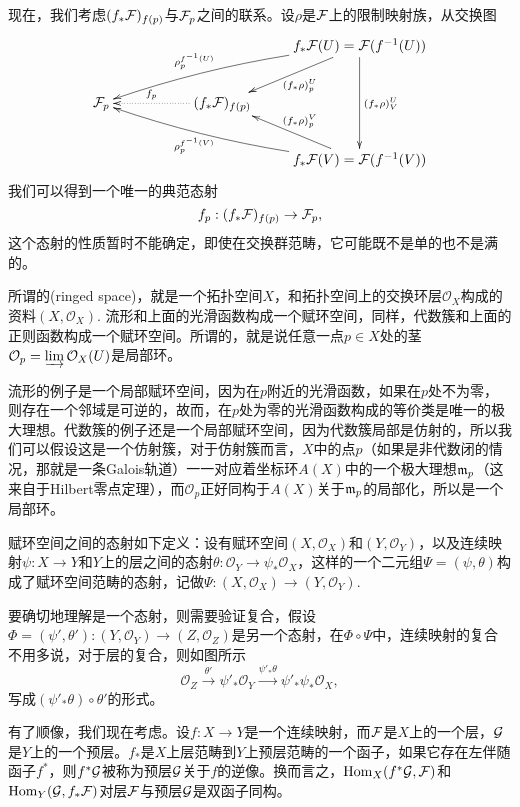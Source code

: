现在，我们考虑$(f_*\mathcal{F})_{f(p)}$与$\mathcal{F}_p$之间的联系。设$\rho$是$\mathcal{F}$上的限制映射族，从交换图
\[
	\xymatrix{
		&&&f_*\calf(U)=\calf(f^{-1}(U))\ar[dl]^{(f_*\rho)_{p}^U}\ar[dd]^{(f_*\rho)^U_{V}}\ar@/_/[llld]_-{\rho_{p}^{f^{-1}(U)}} \\
		\calf_p&&(f_*\calf)_{f(p)}\ar@{.>}[ll]_-{f_p}&\\
		&&&f_*\calf(V)=\calf(f^{-1}(V))\ar[ul]_{(f_*\rho)_{p}^V}\ar@/^/[lllu]^-{\rho_{p}^{f^{-1}(V)}}
	}
\]
我们可以得到一个唯一的典范态射
\[
f_p:(f_*\mathcal{F})_{f(p)}\to \mathcal{F}_p,
\]
这个态射的性质暂时不能确定，即使在交换群范畴，它可能既不是单的也不是满的。

\begin{para}
所谓的(ringed space)，就是一个拓扑空间$X$，和拓扑空间上的交换环层$\mathcal{O}_X$构成的资料$(X,\mathcal{O}_X)$. 流形和上面的光滑函数构成一个赋环空间，同样，代数簇和上面的正则函数构成一个赋环空间。所谓的，就是说任意一点$p\in X$处的茎$\mathcal{O}_p=\varinjlim \mathcal{O}_X(U)$是局部环。
\end{para}

流形的例子是一个局部赋环空间，因为在$p$附近的光滑函数，如果在$p$处不为零，则存在一个邻域是可逆的，故而，在$p$处为零的光滑函数构成的等价类是唯一的极大理想。代数簇的例子还是一个局部赋环空间，因为代数簇局部是仿射的，所以我们可以假设这是一个仿射簇，对于仿射簇而言，$X$中的点$p$（如果是非代数闭的情况，那就是一条Galois轨道）一一对应着坐标环$A(X)$中的一个极大理想$\mathfrak{m}_p$（这来自于Hilbert零点定理），而$\mathcal{O}_p$正好同构于$A(X)$关于$\mathfrak{m}_p$的局部化，所以是一个局部环。

\begin{para}
赋环空间之间的态射如下定义：设有赋环空间$(X,\mathcal{O}_X)$和$(Y,\mathcal{O}_Y)$，以及连续映射$\psi:X\to Y$和$Y$上的层之间的态射$\theta:\mathcal{O}_Y\to \psi_*\mathcal{O}_X$，这样的一个二元组$\Psi=(\psi,\theta)$构成了赋环空间范畴的态射，记做$\Psi:(X,\mathcal{O}_X)\to (Y,\mathcal{O}_Y)$.
\end{para}

要确切地理解是一个态射，则需要验证复合，假设$\Phi=(\psi',\theta'):(Y,\mathcal{O}_Y)\to (Z,\mathcal{O}_Z)$是另一个态射，在$\Phi\circ \Psi$中，连续映射的复合不用多说，对于层的复合，则如图所示
\[
	\mathcal{O}_Z\xrightarrow{\theta'} \psi'_*\mathcal{O}_Y \xrightarrow{\psi'_*\theta} \psi'_*\psi_*\mathcal{O}_X,
\]
写成$(\psi'_*\theta)\circ \theta'$的形式。

\begin{para}
有了顺像，我们现在考虑。设$f:X\to Y$是一个连续映射，而$\mathcal{F}$是$X$上的一个层，$\mathcal{G}$是$Y$上的一个预层。$f_*$是$X$上层范畴到$Y$上预层范畴的一个函子，如果它存在左伴随函子$f^*$，则$f^*\mathcal{G}$被称为预层$\mathcal{G}$关于$f$的逆像。换而言之，$\operatorname{Hom}_X(f^*\mathcal{G},\mathcal{F})$和$\operatorname{Hom}_Y(\mathcal{G},f_*\mathcal{F})$对层$\mathcal{F}$与预层$\mathcal{G}$是双函子同构。
\end{para}

